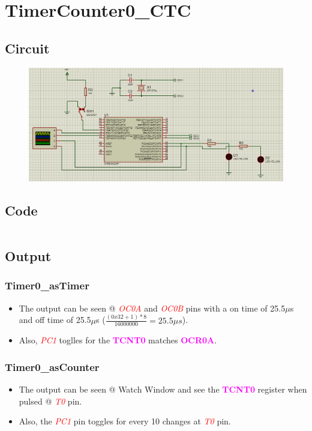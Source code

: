\documentclass[oneside]{book}
\newcommand{\pinFormat}[1]{\emph{\textcolor{red}{#1}}}
\newcommand{\regFormat}[1]{\textbf{\textcolor{magenta}{#1}}}
\begin{document}
\section{TimerCounter0\_CTC}
\subsection{Circuit}
\begin{figure}[H]
    \centering
    \includegraphics[height=0.2\textheight]{TimerCounter0_CTC.png}
\end{figure}
\subsection{Code}
\inputminted[breaklines, bgcolor=black]{c}{./programFiles/TimerCounter0_CTC.c}
\subsection{Output}
\subsubsection{Timer0\_asTimer}
\begin{itemize}
    \item The output can be seen @ \pinFormat{OC0A} and \pinFormat{OC0B} pins with a on time of 25.5$\mu$s and off time of 25.5$\mu$s ($\frac{(0x32+1) * 8}{16000000} = 25.5\mu s$).
    \item Also, \pinFormat{PC1} toglles for the \regFormat{TCNT0} matches \regFormat{OCR0A}.
\end{itemize}
\subsubsection{Timer0\_asCounter}
\begin{itemize}
    \item The output can be seen @ Watch Window and see the \regFormat{TCNT0} register when pulsed @ \pinFormat{T0} pin.
    \item Also, the \pinFormat{PC1} pin toggles for every 10 changes at \pinFormat{T0} pin.
\end{itemize}
\end{document}
